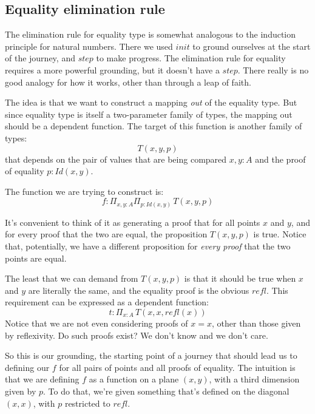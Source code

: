 \documentclass[DaoFP]{subfiles}
\begin{document}
\subsection{Equality elimination rule}

The elimination rule for equality type is somewhat analogous to the induction principle for natural numbers. There we used $\mathit{init}$ to ground ourselves at the start of the journey, and $\mathit{step}$ to make progress. The elimination rule for equality requires a more powerful grounding, but it doesn't have a $\mathit{step}$. There really is no good analogy for how it works, other than through a leap of faith.

The idea is that we want to construct a mapping \emph{out} of the equality type. But since equality type is itself a two-parameter family of types, the mapping out should be a dependent function. The target of this function is another family of types:
\[T(x, y, p)\]
 that depends on the pair of values that are being compared $x, y \colon A$ and the proof of equality $p \colon \mathit{Id}(x, y)$.
 
 The function we are trying to construct is:
 \[ f \colon \Pi_{x, y : A} \Pi_{p : \mathit{Id}(x, y)} \, T(x, y, p) \]

It's convenient to think of it as generating a proof that for all points $x$ and $y$, and for every proof that the two are equal, the proposition $T(x, y, p)$ is true. Notice that, potentially, we have a different proposition for \emph{every proof} that the two points are equal.

The least that we can demand from $T(x, y, p)$ is that it should be true when $x$ and $y$ are literally the same, and the equality proof is the obvious $\mathit{refl}$. This requirement can be expressed as a dependent function:
\[t \colon \Pi_{x : A} \,T\left(x, x, \mathit{refl}(x)\right)\]
Notice that we are not even considering proofs of $x = x$, other than those given by reflexivity. Do such proofs exist? We don't know and we don't care.

So this is our grounding, the starting point of a journey that should lead us to defining our $f$ for all pairs of points and all proofs of equality. The intuition is that we are defining $f$ as a function on a plane $(x, y)$, with a third dimension given by $p$. To do that, we're given something that's defined on the diagonal $(x, x)$, with $p$ restricted to $\mathit{refl}$.
\end{document}
